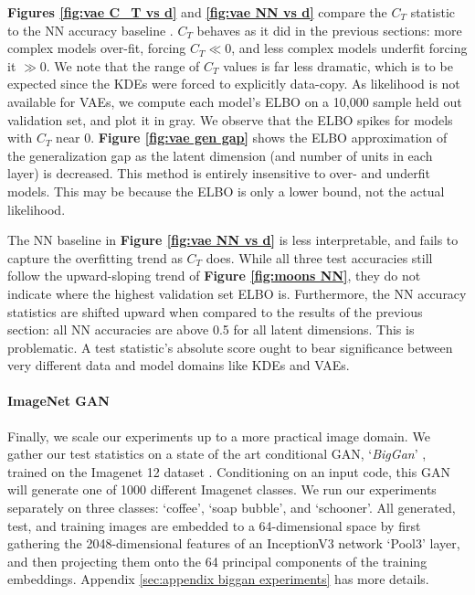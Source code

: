  \textbf{Figures \ref{fig:vae C_T vs d}} and \textbf{\ref{fig:vae NN vs d}} compare the $C_T$ statistic to the NN accuracy baseline . $C_T$ behaves as it did in the previous sections: more complex models over-fit, forcing $C_T \ll 0$, and less complex models underfit forcing it $\gg0$. We note that the range of $C_T$ values is far less dramatic, which is to be expected since the KDEs were forced to explicitly data-copy. As likelihood is not available for VAEs, we compute each model's ELBO on a 10,000 sample held out validation set, and plot it in gray. We observe that the ELBO spikes for models with $C_T$ near 0. \textbf{Figure \ref{fig:vae gen gap}} shows the ELBO approximation of the generalization gap as the latent dimension (and number of units in each layer) is decreased. This method is entirely insensitive to over- and underfit models. This may be because the ELBO is only a lower bound, not the actual likelihood. 

The NN baseline in \textbf{Figure \ref{fig:vae NN vs d}} is less interpretable, and fails to capture the overfitting trend as $C_T$ does. While all three test accuracies still follow the upward-sloping trend of \textbf{Figure \ref{fig:moons NN}}, they do not indicate where the highest validation set ELBO is. Furthermore, the NN accuracy statistics are shifted upward when compared to the results of the previous section: all NN accuracies are above 0.5 for all latent dimensions. This is problematic. A test statistic's absolute score ought to bear significance between very different data and model domains like KDEs and VAEs.

\paragraph{ImageNet GAN}

Finally, we scale our experiments up to a more practical image domain. We gather our test statistics on a state of the art conditional GAN, `\emph{BigGan}' \citep{BigGan}, trained on the Imagenet 12 dataset \citep{imagenet12}. Conditioning on an input code, this GAN will generate one of 1000 different Imagenet classes. We run our experiments separately on three classes: `coffee', `soap bubble', and `schooner'. All generated, test, and training images are embedded to a 64-dimensional space by first gathering the 2048-dimensional features of an InceptionV3 network `Pool3' layer, and then projecting them onto the 64 principal components of the training embeddings. Appendix \ref{sec:appendix biggan experiments} has more details. 

